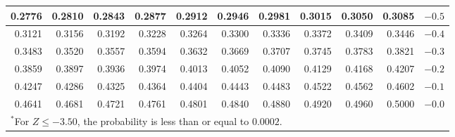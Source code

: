 \begin{table}[H]
\begin{center}
{\begin{tabular}{| rrrrr | rrrrr | c}
  \normalsize{0.2776} & \normalsize{0.2810} & \normalsize{0.2843} & \normalsize{0.2877} & \normalsize{0.2912} & \normalsize{0.2946} & \normalsize{0.2981} & \normalsize{0.3015} & \normalsize{0.3050} & \normalsize{0.3085} & $-0.5$ \\
    \hline
  \normalsize{0.3121} & \normalsize{0.3156} & \normalsize{0.3192} & \normalsize{0.3228} & \normalsize{0.3264} & \normalsize{0.3300} & \normalsize{0.3336} & \normalsize{0.3372} & \normalsize{0.3409} & \normalsize{0.3446} & $-0.4$ \\
  \normalsize{0.3483} & \normalsize{0.3520} & \normalsize{0.3557} & \normalsize{0.3594} & \normalsize{0.3632} & \normalsize{0.3669} & \normalsize{0.3707} & \normalsize{0.3745} & \normalsize{0.3783} & \normalsize{0.3821} & $-0.3$ \\
  \normalsize{0.3859} & \normalsize{0.3897} & \normalsize{0.3936} & \normalsize{0.3974} & \normalsize{0.4013} & \normalsize{0.4052} & \normalsize{0.4090} & \normalsize{0.4129} & \normalsize{0.4168} & \normalsize{0.4207} & $-0.2$ \\
  \normalsize{0.4247} & \normalsize{0.4286} & \normalsize{0.4325} & \normalsize{0.4364} & \normalsize{0.4404} & \normalsize{0.4443} & \normalsize{0.4483} & \normalsize{0.4522} & \normalsize{0.4562} & \normalsize{0.4602} & $-0.1$ \\
  \normalsize{0.4641} & \normalsize{0.4681} & \normalsize{0.4721} & \normalsize{0.4761} & \normalsize{0.4801} & \normalsize{0.4840} & \normalsize{0.4880} & \normalsize{0.4920} & \normalsize{0.4960} & \normalsize{0.5000} & $-0.0$ \\
    \hline
\multicolumn{11}{l}{{\normalsize$^*$For $Z \leq -3.50$, the probability is less than or equal to $0.0002$.}}
\end{tabular}}
\end{center}
\end{table}

\thispagestyle{empty}

